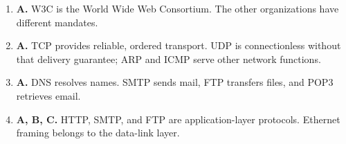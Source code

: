 \begin{enumerate}[label=\textbf{Q\arabic*.}, leftmargin=*]
\item \textbf{A.} W3C is the World Wide Web Consortium. The other organizations have different mandates.

\item \textbf{A.} TCP provides reliable, ordered transport. UDP is connectionless without that delivery guarantee; ARP and ICMP serve other network functions.

\item \textbf{A.} DNS resolves names. SMTP sends mail, FTP transfers files, and POP3 retrieves email.

\item \textbf{A, B, C.} HTTP, SMTP, and FTP are application-layer protocols. Ethernet framing belongs to the data-link layer.

\end{enumerate}
